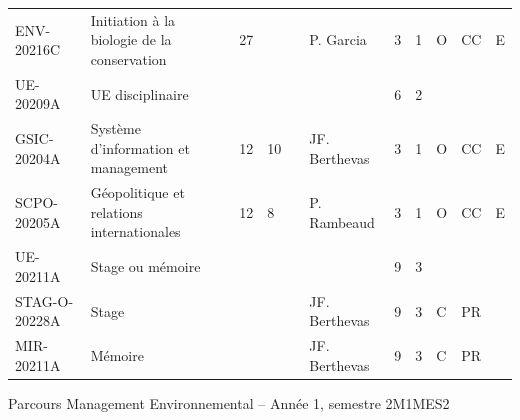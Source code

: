 \documentclass[a4paper,11pt]{article}
\begin{document}
{{\begin{tabular}{lllllllllll}
ENV-20216C                            & Initiation à la biologie de la conservation                             & 27 &    &    & P. Garcia                          & 3    & 1    & O           & CC             & E         \\
\rowcolor[HTML]{EFEFEF} 
\cellcolor[HTML]{FD6864}UE-20209A     & UE disciplinaire                                                        &    &    &    &                                    & 6    & 2    &             &                &           \\
\cellcolor[HTML]{FD6864}GSIC-20204A   & Système d'information et management                                     & 12 & 10 &    & JF. Berthevas                      & 3    & 1    & O           & CC             & E         \\
\cellcolor[HTML]{FD6864}SCPO-20205A   & Géopolitique et relations internationales                               & 12 & 8  &    & P. Rambeaud                        & 3    & 1    & O           & CC             & E         \\
\rowcolor[HTML]{EFEFEF} 
\cellcolor[HTML]{FD6864}UE-20211A     & Stage ou mémoire                                                        &    &    &    &                                    & 9    & 3    &             &                &           \\
\cellcolor[HTML]{FD6864}STAG-O-20228A & Stage                                                                   &    &    &    & JF. Berthevas                      & 9    & 3    & C           & PR             &           \\
\cellcolor[HTML]{FD6864}MIR-20211A    & Mémoire                                                                 &    &    &    & JF. Berthevas                      & 9    & 3    & C           & PR             &          
\end{tabular}}
}{Parcours Management Environnemental -- Année 1, semestre 2}{M1MES2}
\end{document}
